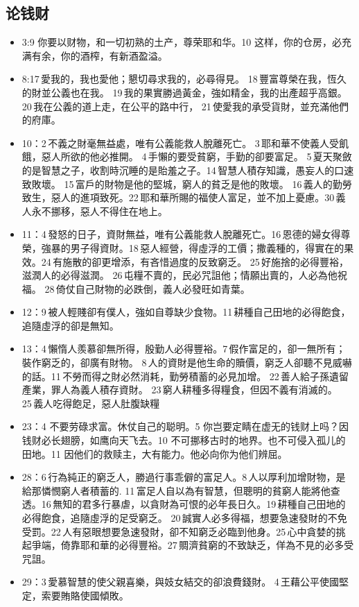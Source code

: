 \subsection{论钱财}
\begin{itemize}
\itemsep-.45em 
\item 3:9 你要以财物，和一切初熟的土产，尊荣耶和华。10 这样，你的仓房，必充满有余，你的酒榨，有新酒盈溢。
\item 8:17 愛我的，我也愛他；懇切尋求我的，必尋得見。 18 豐富尊榮在我，恆久的財並公義也在我。 19 我的果實勝過黃金，強如精金，我的出產超乎高銀。 20 我在公義的道上走，在公平的路中行， 21 使愛我的承受貨財，並充滿他們的府庫。
\item 10：2 不義之財毫無益處，唯有公義能救人脫離死亡。 3 耶和華不使義人受飢餓，惡人所欲的他必推開。 4 手懶的要受貧窮，手勤的卻要富足。 5 夏天聚斂的是智慧之子，收割時沉睡的是貽羞之子。14 智慧人積存知識，愚妄人的口速致敗壞。 15 富戶的財物是他的堅城，窮人的貧乏是他的敗壞。 16 義人的勤勞致生，惡人的進項致死。22 耶和華所賜的福使人富足，並不加上憂慮。30 義人永不挪移，惡人不得住在地上。
\item 11：4 發怒的日子，資財無益，唯有公義能救人脫離死亡。16 恩德的婦女得尊榮，強暴的男子得資財。18 惡人經營，得虛浮的工價；撒義種的，得實在的果效。24 有施散的卻更增添，有吝惜過度的反致窮乏。 25 好施捨的必得豐裕，滋潤人的必得滋潤。 26 屯糧不賣的，民必咒詛他；情願出賣的，人必為他祝福。 28 倚仗自己財物的必跌倒，義人必發旺如青葉。
\item 12：9 被人輕賤卻有僕人，強如自尊缺少食物。11 耕種自己田地的必得飽食，追隨虛浮的卻是無知。
\item 13：4 懶惰人羨慕卻無所得，殷勤人必得豐裕。7 假作富足的，卻一無所有；裝作窮乏的，卻廣有財物。 8 人的資財是他生命的贖價，窮乏人卻聽不見威嚇的話。11 不勞而得之財必然消耗，勤勞積蓄的必見加增。 22 善人給子孫遺留產業，罪人為義人積存資財。 23 窮人耕種多得糧食，但因不義有消滅的。25 義人吃得飽足，惡人肚腹缺糧
\item 23：4 不要劳碌求富。休仗自己的聪明。5 你岂要定睛在虚无的钱财上吗？因钱财必长翅膀，如鹰向天飞去。10 不可挪移古时的地界。也不可侵入孤儿的田地。11 因他们的救赎主，大有能力。他必向你为他们辨屈。
\item 28：6 行為純正的窮乏人，勝過行事乖僻的富足人。8 人以厚利加增財物，是給那憐憫窮人者積蓄的. 11 富足人自以為有智慧，但聰明的貧窮人能將他查透。16 無知的君多行暴虐，以貪財為可恨的必年長日久。19 耕種自己田地的必得飽食，追隨虛浮的足受窮乏。 20 誠實人必多得福，想要急速發財的不免受罰。22 人有惡眼想要急速發財，卻不知窮乏必臨到他身。25 心中貪婪的挑起爭端，倚靠耶和華的必得豐裕。27 賙濟貧窮的不致缺乏，佯為不見的必多受咒詛。
\item 29：3 愛慕智慧的使父親喜樂，與妓女結交的卻浪費錢財。 4 王藉公平使國堅定，索要賄賂使國傾敗。
\end{itemize}


